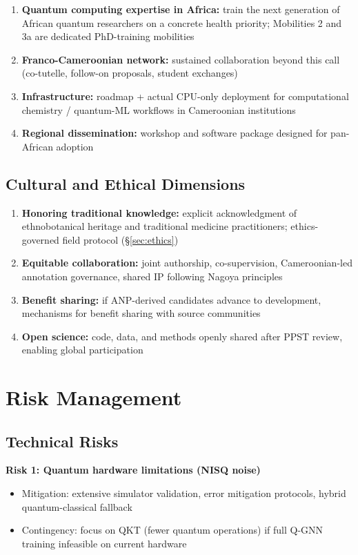 \documentclass[11pt,a4paper]{article}
\begin{document}
\begin{enumerate}
    \item \textbf{Quantum computing expertise in Africa:} train the next generation of African quantum researchers on a concrete health priority; Mobilities 2 and 3a are dedicated PhD-training mobilities
    \item \textbf{Franco-Cameroonian network:} sustained collaboration beyond this call (co-tutelle, follow-on proposals, student exchanges)
    \item \textbf{Infrastructure:} roadmap + actual CPU-only deployment for computational chemistry / quantum-ML workflows in Cameroonian institutions
    \item \textbf{Regional dissemination:} workshop and software package designed for pan-African adoption
\end{enumerate}

\subsection{Cultural and Ethical Dimensions}

\begin{enumerate}
    \item \textbf{Honoring traditional knowledge:} explicit acknowledgment of ethnobotanical heritage and traditional medicine practitioners; ethics-governed field protocol (\S\ref{sec:ethics})
    \item \textbf{Equitable collaboration:} joint authorship, co-supervision, Cameroonian-led annotation governance, shared IP following Nagoya principles \cite{nagoya2011}
    \item \textbf{Benefit sharing:} if ANP-derived candidates advance to development, mechanisms for benefit sharing with source communities
    \item \textbf{Open science:} code, data, and methods openly shared after PPST review, enabling global participation
\end{enumerate}

\section{Risk Management}
\label{sec:risk}

\subsection{Technical Risks}

\textbf{Risk 1: Quantum hardware limitations (NISQ noise)}
\begin{itemize}
    \item Mitigation: extensive simulator validation, error mitigation protocols, hybrid quantum-classical fallback \cite{preskill2018}
    \item Contingency: focus on QKT (fewer quantum operations) if full Q-GNN training infeasible on current hardware
\end{itemize}
\end{document}
